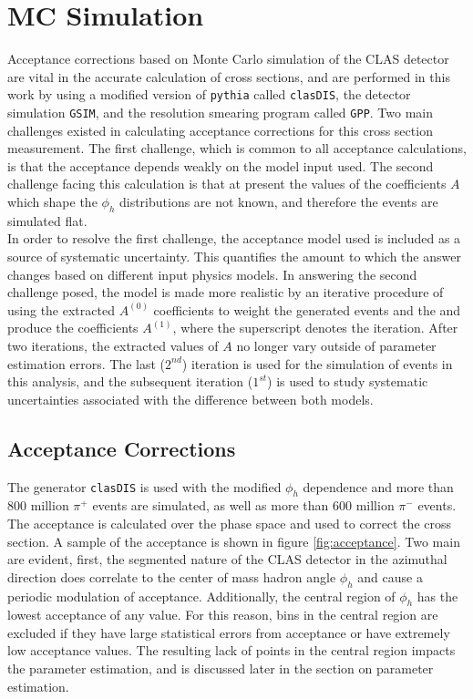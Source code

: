 \section{MC Simulation}
Acceptance corrections based on Monte Carlo simulation of the CLAS detector are vital in the accurate calculation of cross sections, and are performed in this work by using a modified version of \texttt{pythia} called \texttt{clasDIS}, the detector simulation \texttt{GSIM}, and the resolution smearing program called \texttt{GPP}.  Two main challenges existed in calculating acceptance corrections for this cross section measurement.  The first challenge, which is common to all acceptance calculations, is that the acceptance depends weakly on the model input used.  The second challenge facing this calculation is that at present the values of the coefficients $A$ which shape the $\phi_h$ distributions are not known, and therefore the events are simulated flat.  \\  

In order to resolve the first challenge, the acceptance model used is included as a source of systematic uncertainty.  This quantifies the amount to which the answer changes based on different input physics models.  In answering the second challenge posed, the model is made more realistic by an iterative procedure of using the extracted $A^(0)$ coefficients to weight the generated events and the and produce the coefficients $A^(1)$, where the superscript denotes the iteration.  After two iterations, the extracted values of $A$ no longer vary outside of parameter estimation errors.  The last ($2^{nd}$) iteration is used for the simulation of events in this analysis, and the subsequent iteration ($1^{st}$) is used to study systematic uncertainties associated with the difference between both models.  \\

\subsection{Acceptance Corrections}

The generator \texttt{clasDIS} is used with the modified $\phi_h$ dependence and more than 800 million $\pi^+$ events are simulated, as well as more than 600 million $\pi^-$ events.  The acceptance is calculated over the phase space and used to correct the cross section.  A sample of the acceptance is shown in figure \ref{fig:acceptance}.  Two main are evident, first, the segmented nature of the CLAS detector in the azimuthal direction does correlate to the center of mass hadron angle $\phi_h$ and cause a periodic modulation of acceptance.  Additionally, the central region of $\phi_h$ has the lowest acceptance of any value.  For this reason, bins in the central region are excluded if they have large statistical errors from acceptance or have extremely low acceptance values.  The resulting lack of points in the central region impacts the parameter estimation, and is discussed later in the section on parameter estimation.  

